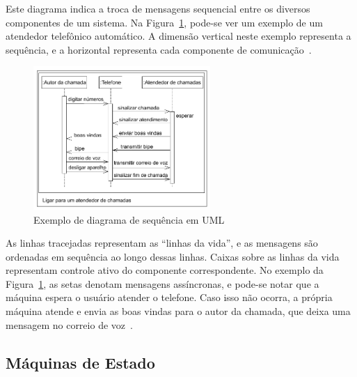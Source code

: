 Este diagrama indica a troca de mensagens sequencial entre os diversos componentes de um sistema. Na Figura~\ref{fig:seq_chart}, pode-se ver um exemplo de um atendedor telefônico automático. A dimensão vertical neste exemplo representa a sequência, e a horizontal representa cada componente de comunicação~\cite{marwedel:2010}.

\begin{figure}[!ht]
	\caption{\label{fig:seq_chart}Exemplo de diagrama de sequência em UML}
	\begin{center}
	    \includegraphics[width=0.6\textwidth]{resources/seq_chart_marwedel_1}
	\end{center}
\end{figure}

As linhas tracejadas representam as ``linhas da vida'', e as mensagens são ordenadas em sequência ao longo dessas linhas. Caixas sobre as linhas da vida representam controle ativo do componente correspondente. No exemplo da Figura~\ref{fig:seq_chart}, as setas denotam mensagens assíncronas, e pode-se notar que a máquina espera o usuário atender o telefone. Caso isso não ocorra, a própria máquina atende e envia as boas vindas para o autor da chamada, que deixa uma mensagem no correio de voz~\cite{marwedel:2010}.


\subsection{Máquinas de Estado}

